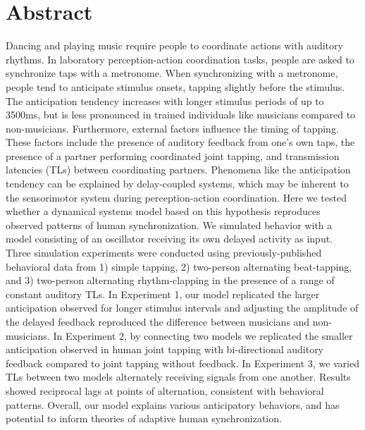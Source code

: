\documentclass{report}
\begin{document}
\section{Abstract}
Dancing and playing music require people to coordinate actions with auditory rhythms. In laboratory perception-action coordination tasks, people are asked to synchronize taps with a metronome. When synchronizing with a metronome, people tend to anticipate stimulus onsets, tapping slightly before the stimulus. The anticipation tendency increases with longer stimulus periods of up to 3500ms, but is less pronounced in trained individuals like musicians compared to non-musicians. Furthermore, external factors influence the timing of tapping. These factors include the presence of auditory feedback from one's own taps, the presence of a partner performing coordinated joint tapping, and transmission latencies (TLs) between coordinating partners. Phenomena like the anticipation tendency can be explained by delay-coupled systems, which may be inherent to the sensorimotor system during perception-action coordination. Here we tested whether a dynamical systems model based on this hypothesis reproduces observed patterns of human synchronization. We simulated behavior with a model consisting of an oscillator receiving its own delayed activity as input. Three simulation experiments were conducted using previously-published behavioral data from 1) simple tapping, 2) two-person alternating beat-tapping, and 3) two-person alternating rhythm-clapping in the presence of a range of constant auditory TLs. In Experiment 1, our model replicated the larger anticipation observed for longer stimulus intervals and adjusting the amplitude of the delayed feedback reproduced the difference between musicians and non-musicians. In Experiment 2, by connecting two models we replicated the smaller anticipation observed in human joint tapping with bi-directional auditory feedback compared to joint tapping without feedback. In Experiment 3, we varied TLs between two models alternately receiving signals from one another. Results showed reciprocal lags at points of alternation, consistent with behavioral patterns. Overall, our model explains various anticipatory behaviors, and has potential to inform theories of adaptive human synchronization.
\end{document}
